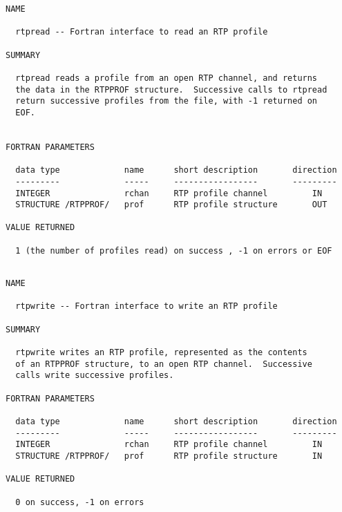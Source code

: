 \documentclass[11pt]{article}
\begin{document}
\newpage
{\footnotesize
\begin{verbatim}
NAME    

  rtpread -- Fortran interface to read an RTP profile

SUMMARY

  rtpread reads a profile from an open RTP channel, and returns
  the data in the RTPPROF structure.  Successive calls to rtpread
  return successive profiles from the file, with -1 returned on
  EOF.


FORTRAN PARAMETERS

  data type             name      short description       direction
  ---------             -----     -----------------       ---------
  INTEGER               rchan     RTP profile channel         IN
  STRUCTURE /RTPPROF/   prof      RTP profile structure       OUT

VALUE RETURNED

  1 (the number of profiles read) on success , -1 on errors or EOF

\end{verbatim}
}

{\footnotesize
\begin{verbatim}

NAME    

  rtpwrite -- Fortran interface to write an RTP profile

SUMMARY

  rtpwrite writes an RTP profile, represented as the contents
  of an RTPPROF structure, to an open RTP channel.  Successive
  calls write successive profiles.

FORTRAN PARAMETERS

  data type             name      short description       direction
  ---------             -----     -----------------       ---------
  INTEGER               rchan     RTP profile channel         IN
  STRUCTURE /RTPPROF/   prof      RTP profile structure       IN

VALUE RETURNED

  0 on success, -1 on errors

\end{verbatim}
}
\end{document}
